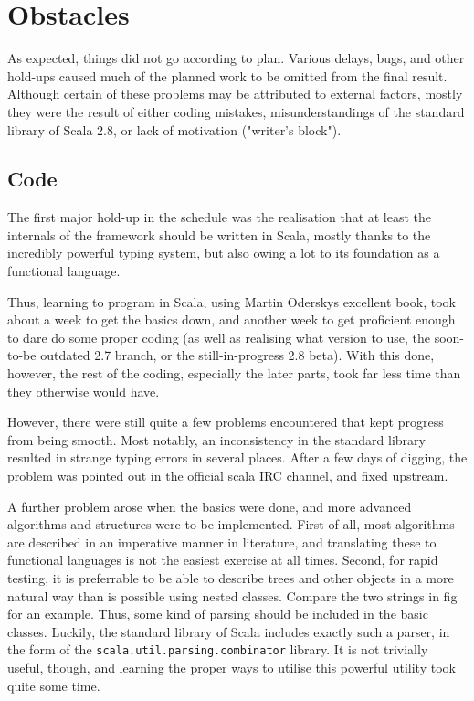 \section{Obstacles}

As expected, things did not go according to plan. Various delays, bugs, and
other hold-ups caused much of the planned work to be omitted from the final
result. Although certain of these problems may be attributed to external
factors, mostly they were the result of either coding mistakes,
misunderstandings of the standard library of Scala 2.8, or lack of
motivation ("writer's block").

\subsection{Code}

The first major hold-up in the schedule was the realisation that at least
the internals of the framework should be written in Scala, mostly thanks to
the incredibly powerful typing system, but also owing a lot to its
foundation as a functional language.

Thus, learning to program in Scala, using Martin Oderskys excellent book,
took about a week to get the basics down, and another week to get
proficient enough to dare do some proper coding (as well as realising what
version to use, the soon-to-be outdated 2.7 branch, or the
still-in-progress 2.8 beta). With this done, however, the rest of the
coding, especially the later parts, took far less time than they otherwise
would have.

However, there were still quite a few problems encountered that kept
progress from being smooth. Most notably, an inconsistency in the standard
library resulted in strange typing errors in several places. After a few
days of digging, the problem was pointed out in the official scala IRC
channel, and fixed upstream.

A further problem arose when the basics were done, and more advanced
algorithms and structures were to be implemented. First of all, most
algorithms are described in an imperative manner in literature, and
translating these to functional languages is not the easiest exercise at
all times. Second, for rapid testing, it is preferrable to be able to
describe trees and other objects in a more natural way than is possible
using nested classes. Compare the two strings in fig %
for an example. Thus, some kind of parsing should be included in the basic
classes. Luckily, the standard library of Scala includes exactly such a
parser, in the form of the \texttt{scala.util.parsing.combinator} library.
It is not trivially useful, though, and learning the proper ways to utilise
this powerful utility took quite some time.

